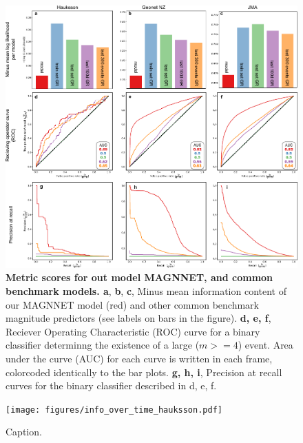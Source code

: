 \documentclass[pdflatex]{sn-jnl}
\begin{document}
\begin{figure}[h!]
    \centering
    \includegraphics[width=1\textwidth]{figures/combined_batplots.pdf}
    \caption{
        \textbf{Metric scores for out model MAGNNET, and common benchmark models. a}, \textbf{b}, \textbf{c}, Minus mean information content of our MAGNNET model (red) and other common benchmark magnitude predictors (see labels on bars in the figure). \textbf{d, e, f}, Reciever Operating Characteristic (ROC) curve for a binary classifier determinng the existence of a large ($m>=4$) event. Area under the curve (AUC) for each curve is written in each frame, colorcoded identically to the bar plots. \textbf{g, h, i}, Precision at recall curves for the binary classifier described in d, e, f. 
    }
    \label{fig:architecture}
\end{figure}



\begin{figure}[h!]
    \centering
    \texttt{[image: figures/info\_over\_time\_hauksson.pdf]}
    \caption{
        Caption.
    }
    \label{fig:architecture}
\end{figure}







\let\oldbibliography\thebibliography
\renewcommand{\thebibliography}[1]{%
  \oldbibliography{#1}%
  \setlength{\itemsep}{10pt}%
}
% 
% 
\newpage

\end{document}
